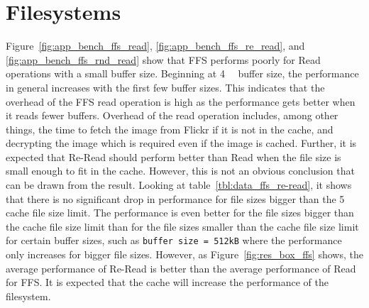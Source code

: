 \section{Filesystems}
\label{sec:dis_fs}
Figure~\ref{fig:app_bench_ffs_read}, \ref{fig:app_bench_ffs_re_read}, and \ref{fig:app_bench_ffs_rnd_read} show that \gls{FFS} performs poorly for Read operations with a small buffer size. Beginning at \SI{4}{\kilo\byte} buffer size, the performance in general increases with the first few buffer sizes. This indicates that the overhead of the \gls{FFS} read operation is high as the performance gets better when it reads fewer buffers. Overhead of the read operation includes, among other things, the time to fetch the image from Flickr if it is not in the cache, and decrypting the image which is required even if the image is cached. Further, it is expected that \mbox{Re-Read} should perform better than Read when the file size is small enough to fit in the cache. However, this is not an obvious conclusion that can be drawn from the result. Looking at table~\ref{tbl:data_ffs_re-read}, it shows that there is no significant drop in performance for file sizes bigger than the \SI{5}{\mega\byte} cache file size limit. The performance is even better for the file sizes bigger than the cache file size limit than for the file sizes smaller than the cache file size limit for certain buffer sizes, such as \texttt{buffer size = 512kB} where the performance only increases for bigger file sizes. However, as Figure~\ref{fig:res_box_ffs} shows, the average performance of \mbox{Re-Read} is better than the average performance of Read for \gls{FFS}. It is expected that the cache will increase the performance of the filesystem.

